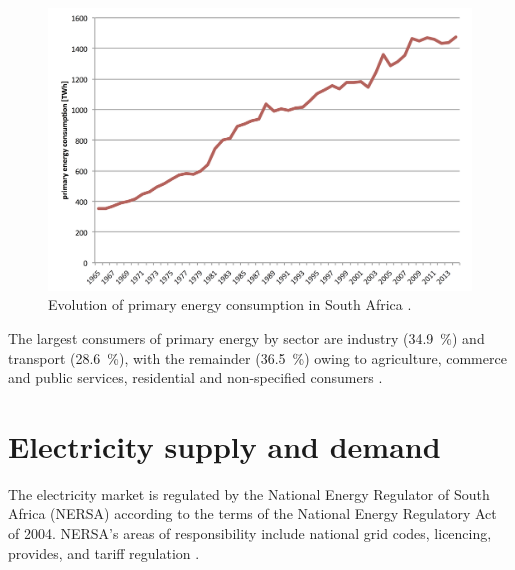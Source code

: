 \begin{figure}[htbp]  
\centering
\includegraphics[width=1\linewidth]{FIG/PrimEnergyDevelopment}
\caption[Evolution of primary energy consumption in South Africa.]{Evolution of primary energy consumption in South Africa \cite{BP2015c}.}\label{PrimEnergyDevelopment}
\end{figure}
The largest consumers of primary energy by sector are industry (\SI{34.9}{\percent}) and transport (\SI{28.6}{\percent}), with the remainder (\SI{36.5}{\percent}) owing to agriculture, commerce and public services, residential and non-specified consumers \cite{DepartmentofEnergy2012}.

\pagebreak
\section{Electricity supply and demand} \label{ElectricitySA}
The electricity market is regulated by the National Energy Regulator of South Africa (NERSA) according to the terms of the National Energy Regulatory Act of 2004. NERSA's areas of responsibility include national grid codes, licencing, provides, and tariff regulation \cite{Eskom2015a}.

